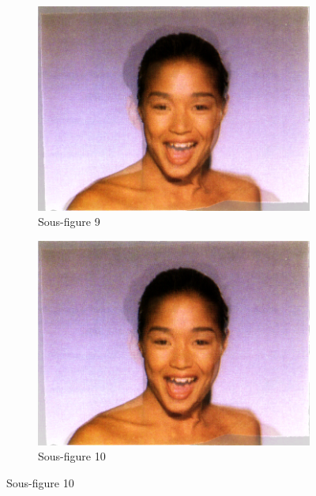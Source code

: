 \begin{figure}[h!]
    \begin{subfigure}{0.45\textwidth}
        \includegraphics[width=\textwidth]{img/testvisuel/frame8.png}
        \caption{Sous-figure 9}
    \end{subfigure}
    \hfill
    \begin{subfigure}{0.45\textwidth}
        \includegraphics[width=\textwidth]{img/testvisuel/frame9.png}
        \caption{Sous-figure 10}
    \end{subfigure}
    

\end{figure}
